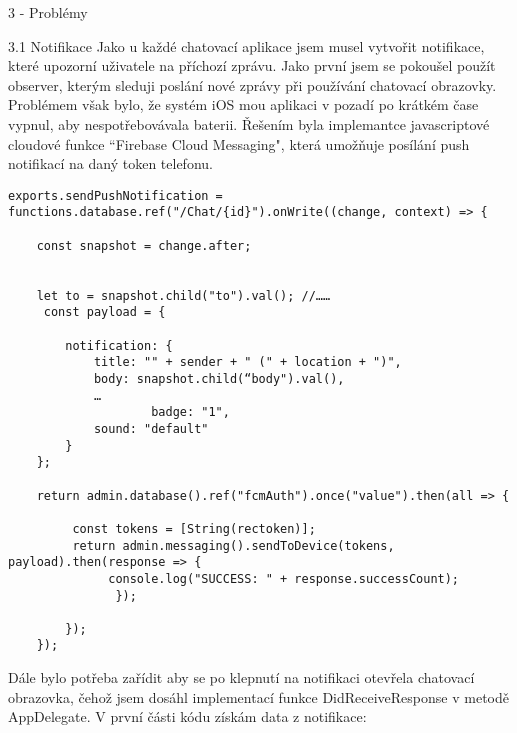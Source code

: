 \documentclass{article}
\begin{document}
3  - Problémy
\vspace{10 mm}

3.1 Notifikace
\vspace{10 mm}
Jako u každé chatovací aplikace jsem musel vytvořit notifikace, které upozorní uživatele na příchozí zprávu. Jako první jsem se pokoušel použít observer, kterým sleduji poslání nové zprávy při používání chatovací obrazovky. Problémem však bylo, že systém iOS mou aplikaci v pozadí po krátkém čase vypnul, aby nespotřebovávala baterii. Řešením byla implemantce javascriptové cloudové funkce “Firebase Cloud Messaging", která umožňuje posílání push notifikací na daný token telefonu. 
\vspace{10 mm}

\begin{verbatim}
exports.sendPushNotification = functions.database.ref("/Chat/{id}").onWrite((change, context) => {
	
    const snapshot = change.after;


    let to = snapshot.child("to").val(); //……
	 const payload = {
    
		notification: {
			title: "" + sender + " (" + location + ")",
			body: snapshot.child(“body").val(),
			…
          			badge: "1",
			sound: "default"
		}
	};
    
	return admin.database().ref("fcmAuth").once("value").then(all => {
        
         const tokens = [String(rectoken)];
  	     return admin.messaging().sendToDevice(tokens, payload).then(response => {
    	      console.log("SUCCESS: " + response.successCount);
      		   });
        
		}); 
	}); 

\end{verbatim}









\vspace{10 mm}
Dále bylo potřeba zařídit aby se po klepnutí na notifikaci otevřela chatovací obrazovka, čehož jsem dosáhl implementací funkce DidReceiveResponse v metodě AppDelegate. V první části kódu získám data z notifikace:
\end{document}
